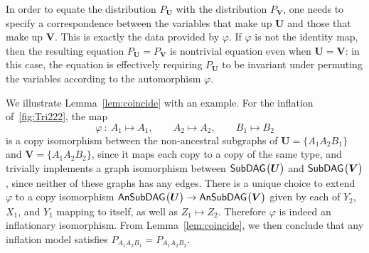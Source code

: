 In order to equate the distribution $P_{\bm{U}}$ with the distribution $P_{\bm{V}}$, one needs to specify a correspondence between the variables that make up $\bm{U}$ and those that make up $\bm{V}$. This is exactly the data provided by $\varphi$. If $\varphi$ is not the identity map, then the resulting equation $P_{\bm{U}} = P_{\bm{V}}$ is nontrivial equation even when $\bm{U}=\bm{V}$: in this case, the equation is effectively requiring $P_{\bm{U}}$ to be invariant under permuting the variables according to the automorphism $\varphi$.

We illustrate Lemma~\ref{lem:coincide} with an example. For the inflation of~\cref{fig:Tri222}, the map
\[
	\varphi \: : \: A_1 \mapsto A_1,\qquad A_2\mapsto A_2,\qquad B_1\mapsto B_2
\]
is a copy isomorphism between the non-ancestral subgraphs of $\bm{U}=\{A_1 A_2 B_1\}$ and $\bm{V}=\{A_1 A_2 B_2\}$, since it maps each copy to a copy of the same type, and trivially implements a graph isomorphism between ${\operatorname{\mathsf{SubDAG}}_{}}\bigl\lparen\bm{U}\bigr\rparen$ and ${\operatorname{\mathsf{SubDAG}}_{}}\bigl\lparen\bm{V}\bigr\rparen$, since neither of these graphs has any edges. There is a unique choice to extend $\varphi$ to a copy isomorphism ${\operatorname{\mathsf{AnSubDAG}}_{}}\bigl\lparen\bm{U}\bigr\rparen\to{\operatorname{\mathsf{AnSubDAG}}_{}}\bigl\lparen\bm{V}\bigr\rparen$ given by each of $Y_2$, $X_1$, and $Y_1$ mapping to itself, as well as $Z_1\mapsto Z_2$. Therefore $\varphi$ is indeed an inflationary isomorphism. From Lemma~\ref{lem:coincide}, we then conclude that any inflation model satisfies $P_{A_1 A_2 B_1} = P_{A_1 A_2 B_2}$.

